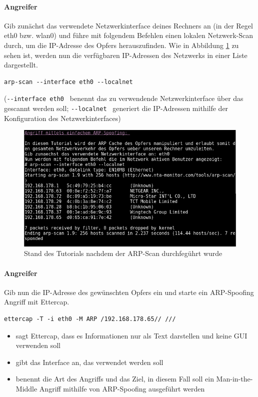 \paragraph{Angreifer} Gib zunächst das verwendete Netzwerkinterface deines Rechners an (in der Regel eth0 bzw. wlan0) und führe mit folgendem Befehlen einen lokalen Netzwerk-Scan durch, um die IP-Adresse des Opfers herauszufinden. Wie in Abbildung \ref{fig:arpscan} zu sehen ist, werden nun die verfügbaren IP-Adressen des Netzwerks in einer Liste dargestellt.
\begin{lstlisting}
arp-scan --interface eth0 --localnet
\end{lstlisting}
(\colorbox{altgray}{\lstinline|--interface eth0 |} benennt das zu verwendende Netzwerkinterface über das gescannt werden soll; \colorbox{altgray}{\lstinline|--localnet |} generiert die IP-Adressen mithilfe der Konfiguration des Netzwerkinterfaces)

\begin{figure}
	\centering
	\includegraphics[width=\textwidth]{images/ARP_Spoofing/arp_scan}
	\caption{Stand des Tutorials nachdem der ARP-Scan durchfegührt wurde}
	\label{fig:arpscan}
\end{figure}

\paragraph{Angreifer} Gib nun die IP-Adresse des gewünschten Opfers ein und starte ein ARP-Spoofing Angriff mit Ettercap.
\begin{lstlisting}
ettercap -T -i eth0 -M ARP /192.168.178.65// ///
\end{lstlisting}

\begin{itemize}
	\item {} sagt Ettercap, dass es  Informationen nur als Text darstellen und keine GUI verwenden soll
	\item {} gibt das Interface an, das verwendet werden soll
	\item {} benennt die Art des Angriffs und das Ziel, in diesem Fall soll ein Man-in-the-Middle Angriff mithilfe von ARP-Spoofing ausgeführt werden
\end{itemize}


